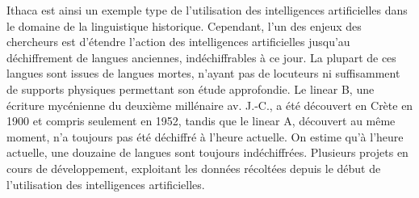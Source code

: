 \documentclass[12pt, french, twoside]{report}
\begin{document}
Ithaca est ainsi un exemple type de l'utilisation des intelligences artificielles dans le domaine de la linguistique historique. 
Cependant, l'un des enjeux des chercheurs est d'étendre l'action des intelligences artificielles jusqu'au déchiffrement de langues anciennes, indéchiffrables à ce jour. La plupart de ces langues sont issues de langues mortes, n'ayant pas de locuteurs ni suffisamment de supports physiques permettant son étude approfondie. Le linear B, une écriture mycénienne du deuxième millénaire av. J.-C., a été découvert en Crète en 1900 et compris seulement en 1952, tandis que le linear A, découvert au même moment, n'a toujours pas été déchiffré à l'heure actuelle. On estime qu'à l'heure actuelle, une douzaine de langues sont toujours indéchiffrées. Plusieurs projets en cours de développement, exploitant les données récoltées depuis le début de l'utilisation des intelligences artificielles.
\end{document}
